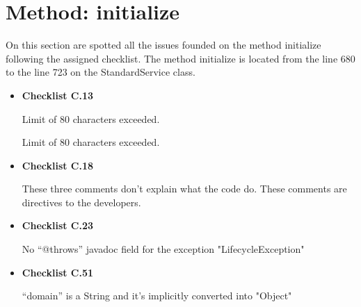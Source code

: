\documentclass[../../../../codeInspection.tex]{subfiles}
\begin{document}
	\section{Method: initialize}

		On this section are spotted all the issues founded on the method initialize following the assigned checklist.
		The method initialize is located from the line 680 to the line 723 on the StandardService class.

		\begin{itemize}

			\item \textbf{Checklist C.13}

				  

				  Limit of 80 characters exceeded.

				  

				  Limit of 80 characters exceeded.

			\item \textbf{Checklist C.18}

				  

				  

				  

				  These three comments don't explain what the code do. These comments are directives to the developers.

			\item \textbf{Checklist C.23}

				  

				  No “@throws” javadoc field for the exception "LifecycleException"

			\item \textbf{Checklist C.51}

				  

				  “domain” is a String and it's implicitly converted into "Object"


\end{itemize}
\end{document}
